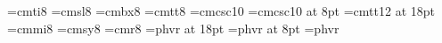 \documentclass[manuscript]{acmart}
\begin{document}
\maketitle

\def\thickrule{\hrule\hrule\hrule}
\def\codent{\hskip 1.0em} %

\font\itVIII=cmti8 \font\slVIII=cmsl8 \font\bfVIII=cmbx8
\font\ttVIII=cmtt8 \font\caps=cmcsc10 \font\capsVIII=cmcsc10 at 8pt
\font\ttXVIII=cmtt12 at 18pt \font\eightmi=cmmi8 \font\eightsy=cmsy8
\font\rmeight=cmr8  \def\rmVIII{\rmeight \baselineskip=10pt plus 2pt
minus 1pt \lineskiplimit=2pt \lineskip=2pt plus 1pt
\parskip=0pt \textfont0=\rmeight \textfont1=\eightmi \textfont2=\eightsy}
\font\hlvXVIII=phvr at 18pt \font\hlvVIII=phvr at 8pt \font\hlv=phvr
\def\:{\mathrel{:\mathord=}}















\end{document}
